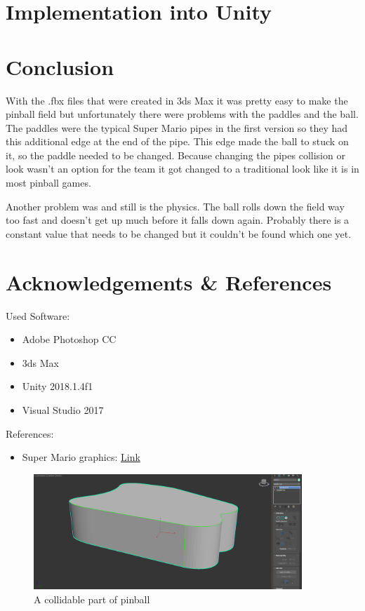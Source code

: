 \documentclass[11.5pt,oneside,a4paper]{scrartcl}
\newcounter{ct}
\begin{document}
\section{Implementation into Unity}

\section{Conclusion}
With the .fbx files that were created in 3ds Max it was pretty easy to make the pinball field but unfortunately there were problems with the paddles and the ball.
The paddles were the typical Super Mario pipes in the first version so they had this additional edge at the end of the pipe. This edge made the ball to stuck on it, so the paddle needed to be changed. Because changing the pipes collision or look wasn't an option for the team it got changed to a traditional look like it is in most pinball games.

Another problem was and still is the physics. The ball rolls down the field way too fast and doesn't get up much before it falls down again. Probably there is a constant value that needs to be changed but it couldn't be found which one yet.

\section{Acknowledgements \& References}
Used Software:
\begin{itemize}
\item Adobe Photoshop CC
\item 3ds Max
\item Unity 2018.1.4f1
\item Visual Studio 2017
\end{itemize}

References:
\begin{itemize}
\item Super Mario graphics: \href{https://google.de/}{Link}
\end{itemize}


\begin{figure}
	\centering
	\includegraphics[width=0.90\textwidth]{3dmodel.jpg}
	\caption{A collidable part of pinball}
	\label{fig:3dmodel}
	\vspace{0.1cm}
\end{figure}
\end{document}
